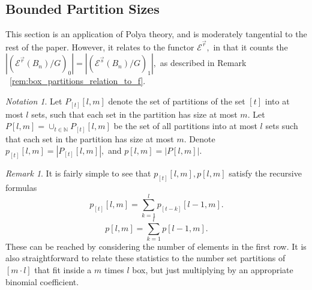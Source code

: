 \documentclass[10 pt]{amsart}
\theoremstyle{plain}
\theoremstyle{definition}
\theoremstyle{remark}
\numberwithin{equation}{section}
\theoremstyle{remark}
\newtheorem{rem}[thm]{Remark}
\newtheorem{note}[thm]{Notation}
\newcommand\ssec{\subsection}
\newcommand\BN{{\mathbb N}}
\renewcommand{\vec}[1]{\overrightarrow{#1}}
\begin{document}
\ssec{Bounded Partition Sizes}
This section is an application of Polya theory, and is moderately tangential to the rest of the paper. However, it relates to the functor $\mathcal E^{\vec r},$ in that it counts the $|(\mathcal E^{\vec r}(B_n)/G)_0| =  |(\mathcal E^{\vec s}(B_n)/G)_1|,$ as described in Remark ~\ref{rem:box_partitions_relation_to_f}.

\begin{note}
Let $P_{[t]}[l,m]$ denote the set of partitions of the set $[t]$ into at most $l$ sets, such that each set in the partition has size at most $m.$ Let $P[l,m] = \cup_{t \in \BN} P_{[t]}[l,m]$ be the set of all partitions into at most $l$ sets such that each set in the partition has size at most $m.$ Denote $p_{[t]}[l,m] = |P_{[t]}[l,m]|,$ and $p[l,m] = |P[l,m]|.$
\end{note}

\begin{rem}
It is fairly simple to see that $p_{[t]}[l,m],p[l,m]$ satisfy the recursive formulas
$$p_{[t]}[l,m] = \sum_{k=1}^l p_{[t-k]}[l-1,m].$$
$$p[l,m] = \sum_{k=1}^l p[l-1,m].$$
These can be reached by considering the number of elements in the first row.
It is also straightforward to relate these statistics to the number set partitions of $[m\cdot l]$ that fit inside a $m$ times $l$ box, but just multiplying by an appropriate binomial coefficient.
\end{rem}
\end{document}
